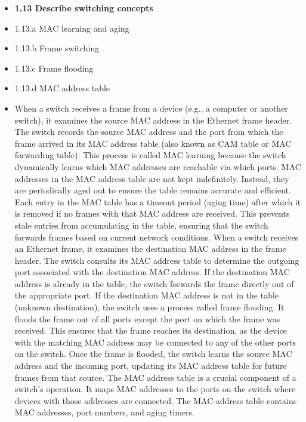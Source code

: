 \documentclass{article}
\begin{document}
\begin{itemize}
\item \textbf{1.13 Describe switching concepts}
\item 1.13.a MAC learning and aging
\item 1.13.b Frame switching
\item 1.13.c Frame flooding
\item 1.13.d MAC address table
	\item[] When a switch receives a frame from a device (e.g., a computer or another switch), it examines the source MAC address in the Ethernet frame header. The switch records the source MAC address and the port from which the frame arrived in its MAC address table (also known as CAM table or MAC forwarding table). This process is called MAC learning because the switch dynamically learns which MAC addresses are reachable via which ports. MAC addresses in the MAC address table are not kept indefinitely. Instead, they are periodically aged out to ensure the table remains accurate and efficient. Each entry in the MAC table has a timeout period (aging time) after which it is removed if no frames with that MAC address are received. This prevents stale entries from accumulating in the table, ensuring that the switch forwards frames based on current network conditions. When a switch receives an Ethernet frame, it examines the destination MAC address in the frame header. The switch consults its MAC address table to determine the outgoing port associated with the destination MAC address. If the destination MAC address is already in the table, the switch forwards the frame directly out of the appropriate port. If the destination MAC address is not in the table (unknown destination), the switch uses a process called frame flooding. It floods the frame out of all ports except the port on which the frame was received. This ensures that the frame reaches its destination, as the device with the matching MAC address may be connected to any of the other ports on the switch. Once the frame is flooded, the switch learns the source MAC address and the incoming port, updating its MAC address table for future frames from that source. The MAC address table is a crucial component of a switch's operation. It maps MAC addresses to the ports on the switch where devices with those addresses are connected. The MAC address table contains MAC addresses, port numbers, and aging timers.
\end{itemize}
\end{document}
